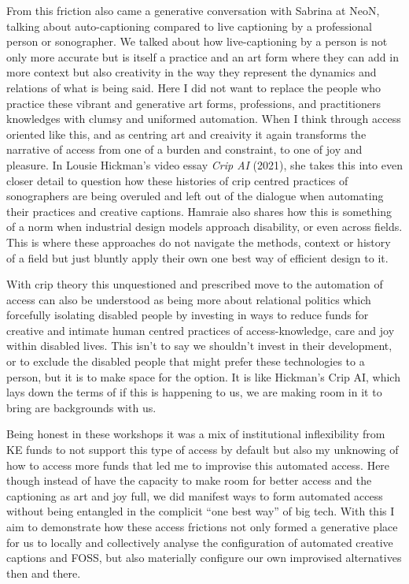 From this friction also came a generative conversation with Sabrina at
NeoN, talking about auto-captioning compared to live captioning by a
professional person or sonographer. We talked about how live-captioning
by a person is not only more accurate but is itself a practice and an
art form where they can add in more context but also creativity in the
way they represent the dynamics and relations of what is being said.
Here I did not want to replace the people who practice these vibrant and
generative art forms, professions, and practitioners knowledges with
clumsy and uniformed automation. When I think through access oriented
like this, and as centring art and creaivity it again transforms the
narrative of access from one of a burden and constraint, to one of joy
and pleasure. In Lousie Hickman's video essay \emph{Crip AI} (2021), she
takes this into even closer detail to question how these histories of
crip centred practices of sonographers are being overuled and left out
of the dialogue when automating their practices and creative captions.
Hamraie also shares how this is something of a norm when industrial
design models approach disability, or even across fields. This is where
these approaches do not navigate the methods, context or history of a
field but just bluntly apply their own one best way of efficient design
to it.

With crip theory this unquestioned and prescribed move to the automation
of access can also be understood as being more about relational politics
which forcefully isolating disabled people by investing in ways to
reduce funds for creative and intimate human centred practices of
access-knowledge, care and joy within disabled lives. This isn't to say
we shouldn't invest in their development, or to exclude the disabled
people that might prefer these technologies to a person, but it is to
make space for the option. It is like Hickman's Crip AI, which lays down
the terms of if this is happening to us, we are making room in it to
bring are backgrounds with us.

Being honest in these workshops it was a mix of institutional
inflexibility from KE funds to not support this type of access by
default but also my unknowing of how to access more funds that led me to
improvise this automated access. Here though instead of have the
capacity to make room for better access and the captioning as art and
joy full, we did manifest ways to form automated access without being
entangled in the complicit ``one best way'' of big tech. With this I aim
to demonstrate how these access frictions not only formed a generative
place for us to locally and collectively analyse the configuration of
automated creative captions and FOSS, but also materially configure our
own improvised alternatives then and there.

